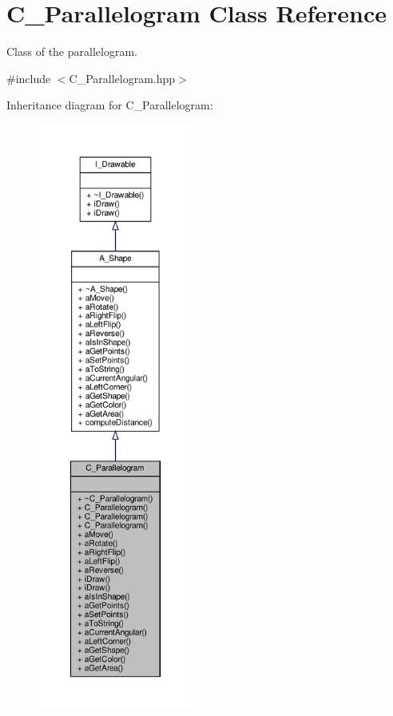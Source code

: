 \hypertarget{classC__Parallelogram}{}\section{C\+\_\+\+Parallelogram Class Reference}
\label{classC__Parallelogram}


Class of the parallelogram.  




{\ttfamily \#include $<$C\+\_\+\+Parallelogram.\+hpp$>$}



Inheritance diagram for C\+\_\+\+Parallelogram\+:\nopagebreak
\begin{figure}[H]
\begin{center}
\leavevmode
\includegraphics[height=550pt]{classC__Parallelogram__inherit__graph}
\end{center}
\end{figure}


